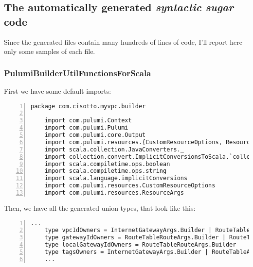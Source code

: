 \subsection{The automatically generated \textit{syntactic sugar} code}
Since the generated files contain many hundreds of lines of code, I'll report here only some samples of each file.\\

\subsubsection{PulumiBuilderUtilFunctionsForScala}
First we have some default imports:\\
\begin{minipage}{\linewidth}
  \begin{lstlisting}[numbers=left, numberstyle=\tiny, numbersep=-5pt, stepnumber=1]
    package com.cisotto.myvpc.builder

    import com.pulumi.Context
    import com.pulumi.Pulumi
    import com.pulumi.core.Output
    import com.pulumi.resources.{CustomResourceOptions, Resource}
    import scala.collection.JavaConverters._
    import collection.convert.ImplicitConversionsToScala.`collection AsScalaIterable`
    import scala.compiletime.ops.boolean
    import scala.compiletime.ops.string
    import scala.language.implicitConversions
    import com.pulumi.resources.CustomResourceOptions
    import com.pulumi.resources.ResourceArgs
  \end{lstlisting}
 \end{minipage}
Then, we have all the generated union types, that look like this:\\
\begin{minipage}{\linewidth}
  \begin{lstlisting}[numbers=left, numberstyle=\tiny, numbersep=-5pt, stepnumber=1]
    ...
    type vpcIdOwners = InternetGatewayArgs.Builder | RouteTableArgs.Builder | SubnetArgs.Builder
    type gatewayIdOwners = RouteTableRouteArgs.Builder | RouteTableAssociationArgs.Builder
    type localGatewayIdOwners = RouteTableRouteArgs.Builder
    type tagsOwners = InternetGatewayArgs.Builder | RouteTableArgs.Builder | ubnetArgs.Builder | VpcArgs.Builder
    ...
  \end{lstlisting}
 \end{minipage}
